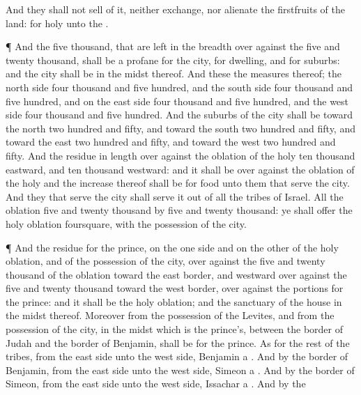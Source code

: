 {And they shall not
sell of it, neither
exchange, nor
alienate the
firstfruits of the
land: for
{}
holy unto the
{}.
\par }{\PP {}¶ And the
five
thousand, that are
left in the
breadth over
against the
five and
twenty
thousand, shall be a
profane
{} for the
city, for
dwelling, and for
suburbs: and the
city shall be in the
midst thereof.
And these
{} the
measures thereof; the
north
side
four
thousand and
five
hundred, and the
south
side
four
thousand and
five
hundred, and on the
east
side
four
thousand and
five
hundred, and the
west
side
four
thousand and
five
hundred.
And the
suburbs of the
city shall be toward the
north two
hundred and
fifty, and toward the
south two
hundred and
fifty, and toward the
east two
hundred and
fifty, and toward the
west two
hundred and
fifty.
And the
residue in
length over
against the
oblation of the
holy
{}
ten
thousand
eastward, and
ten
thousand
westward: and it shall be over
against the
oblation of the
holy
{} and the
increase thereof shall be for
food unto them that
serve the
city.
And they that
serve the
city shall
serve it out of all the
tribes of
Israel.
All the
oblation
{}
five and
twenty
thousand by
five and
twenty
thousand: ye shall
offer the
holy
oblation
foursquare, with the
possession of the
city.
\par }{\PP {}¶ And the
residue
{} for the
prince, on the one side and on the other of the
holy
oblation, and of the
possession of the
city, over
against the
five and
twenty
thousand of the
oblation toward the
east
border, and
westward over
against the
five and
twenty
thousand toward the
west
border, over
against the
portions for the
prince: and it shall be the
holy
oblation; and the
sanctuary of the
house
{} in the
midst thereof.
Moreover from the
possession of the
Levites, and from the
possession of the
city,
{} in the
midst
{} which is the
prince’s, between the
border of
Judah and the
border of
Benjamin, shall be for the
prince.
As for the
rest of the
tribes, from the
east
side unto the
west
side,
Benjamin
{}
a
{}.
And by the
border of
Benjamin, from the
east
side unto the
west
side,
Simeon
{}
a
{}.
And by the
border of
Simeon, from the
east
side unto the
west
side,
Issachar
a
{}.
And by the
}
